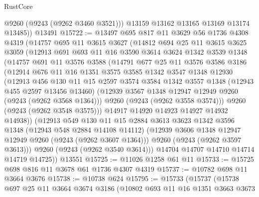 \begin{lexlean}{RustCore}
\begin{coremodule}
          @9260
          (@9243 (@9262 @3460 @3521)))
        @13159
        @13162
        @13165
        @13169
        @13174
        @13485))
    @13491
@15722 := @13497
    @695
    @817
    @11
    @3629
    @56
    @1736
    @4308
    @4319
    (@14757
      @695
      @11
      @3615
      @3627
      (@14812
        @694
        @25
        @11
        @3615
        @3625
        @3059
        (@12913
          @691
          @693
          @11
          @16
          @3590
          @3614
          @3624
          @1342
          @3539
          @1348
          (@14757
            @691
            @11
            @3576
            @3588
            (@14791
              @677
              @25
              @11
              @3576
              @3586
              @3186
              (@12914
                @676
                @11
                @16
                @1351
                @3575
                @3585
                @1342
                @3547
                @1348
                @12930
                (@12913
                  @456
                  @130
                  @11
                  @15
                  @2597
                  @3574
                  @3584
                  @1342
                  @3557
                  @1348
                  (@12943 @455 @2597 @13456 @13460)
                  (@12939 @3567 @1348 @12947 @12949 @9260 (@9243 (@9262 @3568 @1364)))
                  @9260
                  (@9243 (@9262 @3558 @3574)))
                @9260
                (@9243 (@9262 @3548 @3575)))
              @14917
              @14920
              @14923
              @14927
              @14932
              @14938))
          (@12913
            @549
            @130
            @11
            @15
            @2884
            @3613
            @3623
            @1342
            @3596
            @1348
            (@12943 @548 @2884 @14108 @14112)
            (@12939 @3606 @1348 @12947 @12949 @9260 (@9243 (@9262 @3607 @1364)))
            @9260
            (@9243 (@9262 @3597 @3613)))
          @9260
          (@9243 (@9262 @3540 @3614)))
        @14704
        @14707
        @14710
        @14714
        @14719
        @14725))
    @13551
@15725 := @11026 @1258 @61 @11
@15733 := @15725 @698 @816 @11 @3678 @61 @1736 @4307 @4319
@15737 := @10782 @698 @11 @3664 @3676
@15738 := @10738 @624
@15795 := @15733
    (@15737
      (@15738
        @697
        @25
        @11
        @3664
        @3674
        @3186
        (@10802
          @693
          @11
          @16
          @1351
          @3663
          @3673

\end{coremodule}
\end{lexlean}
